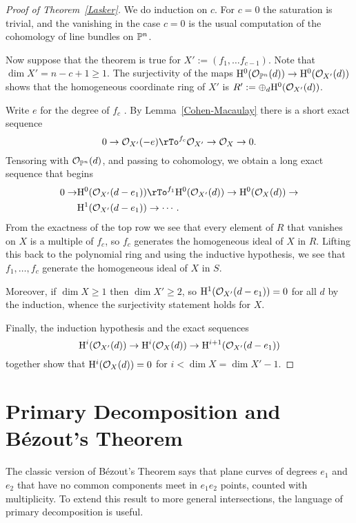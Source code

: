 \documentclass[12pt, leqno]{book}
\begin{document}
\begin{proof} [Proof of Theorem~\ref{Lasker}] We do induction on $c$. For $c=0$ the saturation is trivial, and the vanishing in the case $c=0$ is the usual computation of the cohomology of line bundles on $\PP^{n}$. 

Now suppose that the theorem is true for $X' := (f_{1}, \dots f_{c-1})$. Note that $\dim X' = n-c+1\geq 1$.
 The surjectivity of 
the maps $\HH^{0}(\cO_{\PP^{n}}(d)) \to \HH^{0}(\cO_{X'}(d))$ shows that the homogeneous coordinate ring
of $X'$ is $R':=\oplus_{d} \HH^{0}(\cO_{X'}(d))$.

Write $e$ for the degree of $f_{c}$ . By Lemma~\ref{Cohen-Macaulay} there is a short
exact sequence
$$
0\to \cO_{X'}(-e) \rTo^{f_{c}} \cO_{X'} \to \cO_{X} \to 0.
$$
Tensoring with $\cO_{\PP^{n}}(d)$, and passing to cohomology, we obtain a long exact sequence that begins
\begin{align*}
0\to &\HH^{0}(\cO_{X'}(d-e_{1})) \rTo^{f_{1}}  \HH^{0}(\cO_{X'}(d)) \to  \HH^{0}(\cO_{X}(d))\to\\
&\HH^{1}(\cO_{X'}(d-e_{1}))\to \cdots .
\end{align*}
From the exactness of the top row we see that every element of $R$ 
that vanishes on $X$ is a multiple of $f_{c}$, so $f_{c}$ generates the homogeneous ideal of $X$ in $R$.
Lifting this back to the polynomial ring and using
 the inductive hypothesis, we see that $f_{1},\dots, f_{c}$ generate the homogeneous ideal of
$X$ in $S$.

Moreover, if $\dim X\geq 1$ then $\dim X' \geq 2$, so $\HH^{1}(\cO_{X'}(d-e_{1})) = 0$ for all $d$ by the induction,
whence the surjectivity statement holds for $X$.

Finally, the induction hypothesis and the exact sequences
$$
\HH^{i}(\cO_{X'}(d)) \to  \HH^{i}(\cO_{X}(d))\to \HH^{i+1}(\cO_{X'}(d-e_{1}))
$$
together show that $\HH^{i}(\cO_{X}(d)) = 0$ for $i<\dim X = \dim X'-1$.

\end{proof}

\section{Primary Decomposition and B\'ezout's Theorem}

The classic version of B\'ezout's Theorem says that plane curves of degrees $e_{1}$ and $e_{2}$ that
have no common components meet in $e_{1}e_{2}$ points, counted with multiplicity. To extend this
result to more general intersections, the language of primary decomposition is useful.
\end{document}
